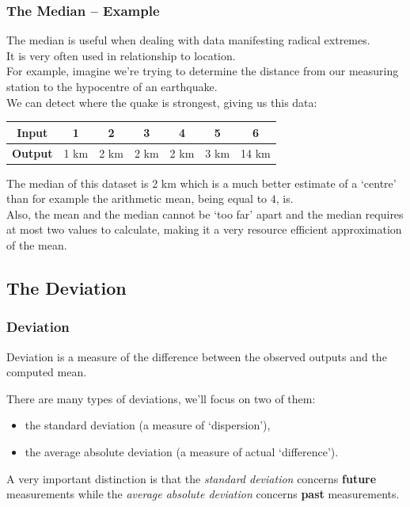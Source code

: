 \documentclass[aspectratio=169,11pt,svgnames]{beamer}
\begin{document}
\begin{frame}
 \frametitle{The Median -- Example}
 The median is useful when dealing with data manifesting radical extremes.\\
 \pause
 It is very often used in relationship to \alert{location}.\\
 \pause
 For example, imagine we're trying to determine the distance from our measuring
 station to the hypocentre of an earthquake.\\
 \pause
 We can detect where the quake is strongest, giving us this data:
 \begin{center}
  \begin{tabular}{c|cccccc}
   \textbf{Input} & 1 & 2 & 3 & 4 & 5 & 6\\
   \midrule
   \textbf{Output} & 1 km & 2 km & 2 km & 2 km & 3 km & 14 km
  \end{tabular}
 \end{center}
 \pause
 The median of this dataset is 2 km which is a much better estimate of a
 `centre' than for example the arithmetic mean, being equal to $4$, is.\\
 \pause
 Also, the mean and the median cannot be `too far' apart and the median requires
 at most two values to calculate, making it a very resource efficient
 approximation of the mean.
\end{frame}

\subsection{The Deviation}
\begin{frame}
 \frametitle{}
 \subsectionpage
\end{frame}

\begin{frame}
 \frametitle{Deviation}
 \begin{tcolorbox}[title=Deviation]
  \alert{Deviation} is a measure of the difference between the observed outputs
  and the computed mean.
 \end{tcolorbox}
 \pause
 There are many types of deviations, we'll focus on two of them:
 \pause
 \begin{itemize}[label=\textbullet]
  \item the \alert{standard deviation} (a measure of `dispersion'),
  \pause
  \item the \alert{average absolute deviation} (a measure of actual
   `difference').
 \end{itemize}
 \pause
 A \alert{very important distinction} is that the \emph{standard deviation}
 concerns \textbf{future} measurements while the \emph{average absolute
 deviation} concerns \textbf{past} measurements.
\end{frame}
\end{document}
